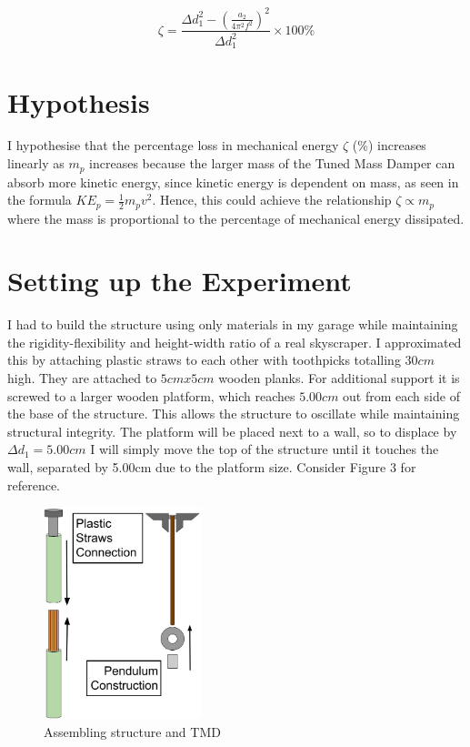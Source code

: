 \documentclass[11pt]{article}
\begin{document}
\begin{equation}
    \label{eqn:zeta}
    \zeta=\frac{\Delta d_1^2-(\frac{a_2}{4\pi^2f^2})^2}{\Delta d_1^2} \times 100\%
\end{equation}

\section{Hypothesis}
I hypothesise that the percentage loss in mechanical energy $\zeta$ (\%) increases linearly as $m_p$ increases because the larger mass of the Tuned Mass Damper can absorb more kinetic energy, since kinetic energy is dependent on mass, as seen in the formula $KE_p=\frac{1}{2}m_pv^2$. Hence, this could achieve the relationship $\zeta \propto m_p$ where the mass is proportional to the percentage of mechanical energy dissipated.

\section{Setting up the Experiment}

I had to build the structure using only materials in my garage while maintaining the rigidity-flexibility and height-width ratio of a real skyscraper. I approximated this by attaching plastic straws to each other with toothpicks totalling $30cm$ high. They are attached to $5cm x 5cm$ wooden planks. For additional support it is screwed to a larger wooden platform, which reaches $5.00cm$ out from each side of the base of the structure. This allows the structure to oscillate while maintaining structural integrity. The platform will be placed next to a wall, so to displace by $\Delta d_1 = 5.00cm$ I will simply move the top of the structure until it touches the wall, separated by 5.00cm due to the platform size. Consider Figure 3 for reference.
\begin{figure}[h]
\centering
\includegraphics[width=130pt]{img/fig3.jpg}
\caption{\label{fig:3}Assembling structure and TMD}
\vspace{-10pt}
\end{figure}
\end{document}
